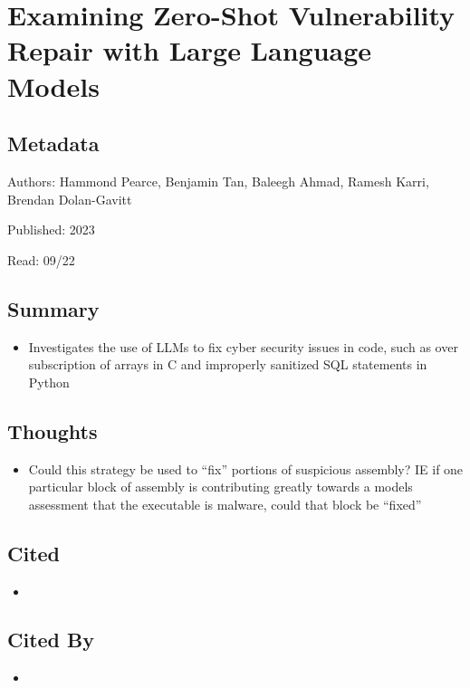 \documentclass{article}
\begin{document}



\section*{Examining Zero-Shot Vulnerability Repair with Large Language Models}

\subsection*{Metadata}

\noindent Authors:  Hammond Pearce, Benjamin Tan, Baleegh Ahmad, Ramesh Karri, Brendan Dolan-Gavitt

\noindent Published: 2023

\noindent Read: 09/22

\subsection*{Summary}
\begin{itemize}
	\item Investigates the use of LLMs to fix cyber security issues in code, such as over subscription of arrays in C and improperly sanitized SQL statements in Python
\end{itemize}

\subsection*{Thoughts}
\begin{itemize}
	\item Could this strategy be used to ``fix'' portions of suspicious assembly? IE if one particular block of assembly is contributing greatly towards a models assessment that the executable is malware, could that block be ``fixed''
\end{itemize}

\subsection*{Cited}
\begin{itemize}
	\item
\end{itemize}

\subsection*{Cited By}
\begin{itemize}
	\item
\end{itemize}
\end{document}
